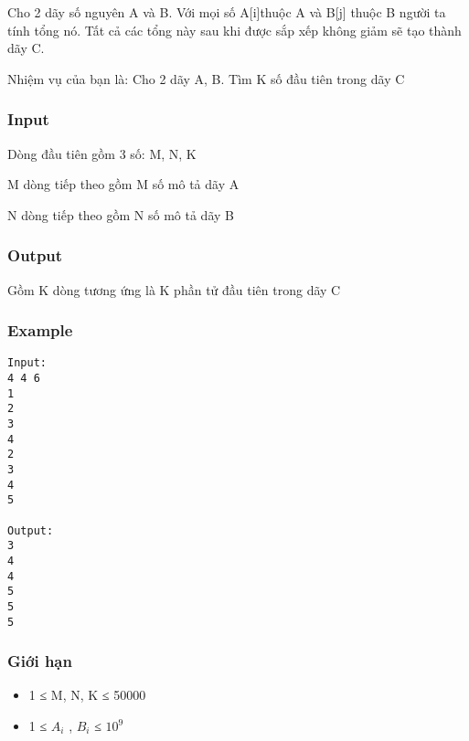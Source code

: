 



   Cho 2 dãy số nguyên A và B. Với mọi số A[i]thuộc A và B[j] thuộc B người ta tính tổng nó. Tất cả các tổng này sau khi được sắp xếp không giảm sẽ tạo thành dãy C.  

   Nhiệm vụ của bạn là: Cho 2 dãy A, B. Tìm K số đầu tiên trong dãy C  

\subsubsection{   Input  }

   Dòng đầu tiên gồm 3 số: M, N, K  

   M dòng tiếp theo gồm M số mô tả dãy A  

   N dòng tiếp theo gồm N số mô tả dãy B  

\subsubsection{   Output  }

   Gồm K dòng tương ứng là K phần tử đầu tiên trong dãy C  

\subsubsection{   Example  }
\begin{verbatim}
Input:
4 4 6
1
2
3
4
2
3
4
5

Output:
3
4
4
5
5
5
\end{verbatim}

\subsubsection{   Giới hạn  }
\begin{itemize}
	\item     1 ≤ M, N, K ≤ 50000   
	\item     1 ≤ $A_{i}$    , $B_{i}$    ≤ $10^{9}$
\end{itemize}
